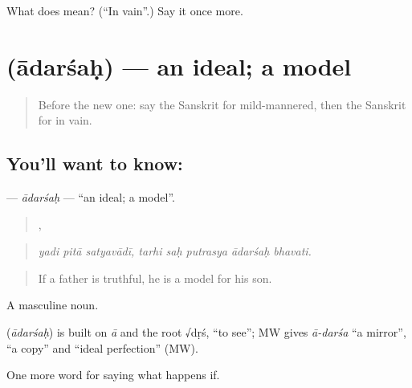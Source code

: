 \begin{tcolorbox}[breakable,colback=teal!4,colframe=teal!35!black,title={Before you move on}]
What does  mean? (\textquotedblleft{}In vain\textquotedblright{}.) Say it once more.
\end{tcolorbox}
\section[\texorpdfstring{\sk{आदर्शः} (ādarśaḥ)}{आदर्शः (ādarśaḥ)}]{ (ādarśaḥ) — an ideal; a model}

\label{lesson:SA-C388-adarsah}



\begin{quote}
Before the new one: say the Sanskrit for mild-mannered, then the Sanskrit for in vain.
\end{quote}

\subsection*{You'll want to know: }
\textbf{} — \emph{ādarśaḥ} — \textquotedblleft{}an ideal; a model\textquotedblright{}.

\begin{quote}
  ,     
\end{quote}

\begin{quote}
\emph{yadi pitā satyavādī, tarhi saḥ putrasya ādarśaḥ bhavati.}
\end{quote}

\begin{quote}
If a father is truthful, he is a model for his son.
\end{quote}

A masculine noun.

\begin{cousinweb}
\textbf{} (\emph{ādarśaḥ}) is built on \emph{ā} and the root √dṛś, \textquotedblleft{}to see\textquotedblright{}; MW gives \emph{ā-darśa} \textquotedblleft{}a mirror\textquotedblright{}, \textquotedblleft{}a copy\textquotedblright{} and \textquotedblleft{}ideal perfection\textquotedblright{} (MW).
\end{cousinweb}

\begin{grammarlens}[title={What you've built}]
One more word for saying what happens if.
\end{grammarlens}

